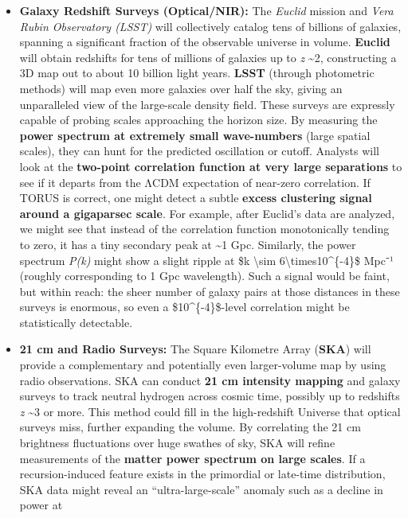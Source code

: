 \begin{itemize}
\item
  \textbf{Galaxy Redshift Surveys (Optical/NIR):} The \emph{Euclid}
  mission and \emph{Vera Rubin Observatory (LSST)} will collectively
  catalog tens of billions of galaxies, spanning a significant fraction
  of the observable universe in volume. \textbf{Euclid} will obtain
  redshifts for tens of millions of galaxies up to \emph{z}
  \textasciitilde{}2, constructing a 3D map out to about 10 billion
  light years. \textbf{LSST} (through photometric methods) will map even
  more galaxies over half the sky, giving an unparalleled view of the
  large-scale density field. These surveys are expressly capable of
  probing scales approaching the horizon size. By measuring the
  \textbf{power spectrum at extremely small wave-numbers} (large spatial
  scales), they can hunt for the predicted oscillation or cutoff.
  Analysts will look at the \textbf{two-point correlation function at
  very large separations} to see if it departs from the ΛCDM expectation
  of near-zero correlation​. If TORUS is correct, one might detect a
  subtle \textbf{excess clustering signal around a gigaparsec scale}​.
  For example, after Euclid's data are analyzed, we might see that
  instead of the correlation function monotonically tending to zero, it
  has a tiny secondary peak at \textasciitilde{}1 Gpc. Similarly, the
  power spectrum \emph{P(k)} might show a slight ripple at \$k
  \textbackslash{}sim 6\textbackslash{}times10\^{}\{-4\}\$ Mpc⁻¹
  (roughly corresponding to 1 Gpc wavelength). Such a signal would be
  faint, but within reach: the sheer number of galaxy pairs at those
  distances in these surveys is enormous, so even a
  \$10\^{}\{-4\}\$-level correlation might be statistically detectable​.
\item
  \textbf{21 cm and Radio Surveys:} The Square Kilometre Array
  (\textbf{SKA}) will provide a complementary and potentially even
  larger-volume map by using radio observations. SKA can conduct
  \textbf{21 cm intensity mapping} and galaxy surveys to track neutral
  hydrogen across cosmic time, possibly up to redshifts \emph{z}
  \textasciitilde{}3 or more. This method could fill in the
  high-redshift Universe that optical surveys miss, further expanding
  the volume. By correlating the 21 cm brightness fluctuations over huge
  swathes of sky, SKA will refine measurements of the \textbf{matter
  power spectrum on large scales}​. If a recursion-induced feature
  exists in the primordial or late-time distribution, SKA data might
  reveal an ``ultra-large-scale'' anomaly such as a decline in power at

\end{itemize}

